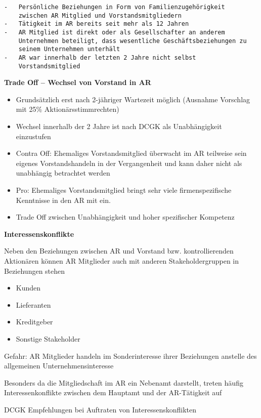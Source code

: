 \documentclass[
]{article}
\providecommand{\tightlist}{%
  \setlength{\itemsep}{0pt}\setlength{\parskip}{0pt}}
\begin{document}
\begin{verbatim}
-   Persönliche Beziehungen in Form von Familienzugehörigkeit
    zwischen AR Mitglied und Vorstandsmitgliedern
-   Tätigkeit im AR bereits seit mehr als 12 Jahren
-   AR Mitglied ist direkt oder als Gesellschafter an anderem
    Unternehmen beteiligt, dass wesentliche Geschäftsbeziehungen zu
    seinem Unternehmen unterhält
-   AR war innerhalb der letzten 2 Jahre nicht selbst
    Vorstandsmitglied
\end{verbatim}

\textbf{Trade Off -- Wechsel von Vorstand in AR}

\begin{itemize}
\tightlist
\item
  Grundsätzlich erst nach 2-jähriger Wartezeit möglich (Ausnahme
  Vorschlag mit 25\% Aktionärsstimmrechten)
\item
  Wechsel innerhalb der 2 Jahre ist nach DCGK als Unabhängigkeit
  einzustufen
\item
  Contra Off: Ehemaliges Vorstandsmitglied überwacht im AR teilweise
  sein eigenes Vorstandshandeln in der Vergangenheit und kann daher
  nicht als unabhängig betrachtet werden
\item
  Pro: Ehemaliges Vorstandsmitglied bringt sehr viele firmenspezifische
  Kenntnisse in den AR mit ein.
\item
  Trade Off zwischen Unabhängigkeit und hoher spezifischer Kompetenz
\end{itemize}

\textbf{Interessenskonflikte}

Neben den Beziehungen zwischen AR und Vorstand bzw. kontrollierenden
Aktionären können AR Mitglieder auch mit anderen Stakeholdergruppen in
Beziehungen stehen

\begin{itemize}
\tightlist
\item
  Kunden
\item
  Lieferanten
\item
  Kreditgeber
\item
  Sonstige Stakeholder
\end{itemize}

Gefahr: AR Mitglieder handeln im Sonderinteresse ihrer Beziehungen
anstelle des allgemeinen Unternehmensinteresse

Besonders da die Mitgliedschaft im AR ein Nebenamt darstellt, treten
häufig Interessenkonflikte zwischen dem Hauptamt und der AR-Tätigkeit
auf

DCGK Empfehlungen bei Auftraten von Interessenskonflikten
\end{document}
